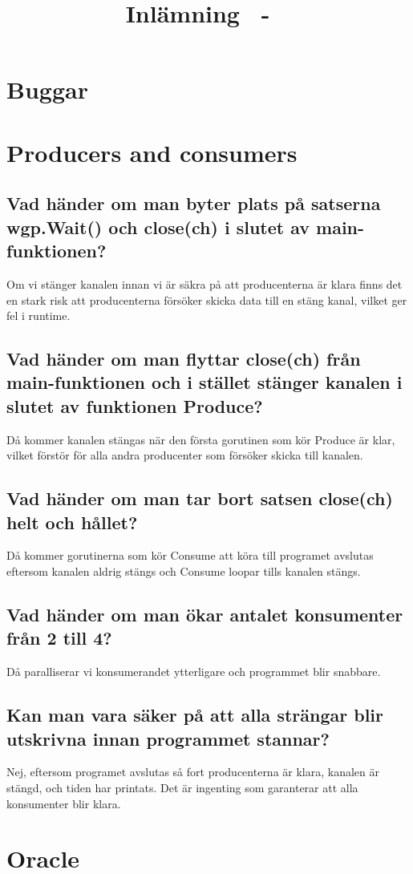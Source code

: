 \documentclass[a4paper,10pt,twoside]{article}
\date{\thedate}
\author{\theauthor}
\title{Inlämning \homeworknumber\ - \course\ \coursename}
\begin{document}

\clearpage
\thispagestyle{empty}
\mbox{} %
\clearpage 

\setcounter{page}{1}
\section{Buggar}



\section{Producers and consumers}
\subsection{Vad händer om man byter plats på satserna wgp.Wait() och close(ch) i slutet av main-funktionen?}
Om vi stänger kanalen innan vi är säkra på att producenterna är klara finns det en stark risk att producenterna försöker skicka data till en stäng kanal, vilket ger fel i runtime.

\subsection{Vad händer om man flyttar close(ch) från main-funktionen och i stället stänger kanalen i slutet av funktionen Produce?}
Då kommer kanalen stängas när den första gorutinen som kör Produce är klar, vilket förstör för alla andra producenter som försöker skicka till kanalen.

\subsection{Vad händer om man tar bort satsen close(ch) helt och hållet?}
Då kommer gorutinerna som kör Consume att köra till programet avslutas eftersom kanalen aldrig stängs och Consume loopar tills kanalen stängs.

\subsection{Vad händer om man ökar antalet konsumenter från 2 till 4?}
Då paralliserar vi konsumerandet ytterligare och programmet blir snabbare.

\subsection{Kan man vara säker på att alla strängar blir utskrivna innan programmet stannar?}
Nej, eftersom programet avslutas så fort producenterna är klara, kanalen är stängd, och tiden har printats. Det är ingenting som garanterar att alla konsumenter blir klara.


\section{Oracle}

\end{document}
